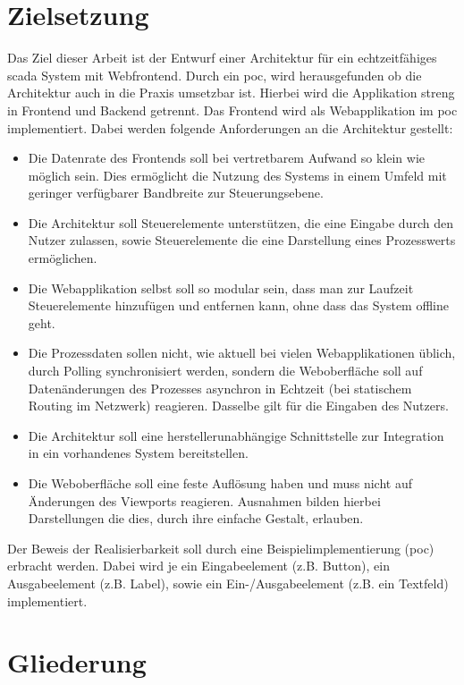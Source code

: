 \section{Zielsetzung}
Das Ziel dieser Arbeit ist der Entwurf einer Architektur für ein
echtzeitfähiges \ac{scada} System mit Webfrontend.
Durch ein \ac{poc}, wird herausgefunden ob die Architektur auch in die Praxis umsetzbar ist.
Hierbei wird die Applikation streng in Frontend und Backend getrennt. Das Frontend wird als Webapplikation im \ac{poc} implementiert.
Dabei werden folgende Anforderungen an die Architektur gestellt:
\begin{itemize}
    \item   Die Datenrate des Frontends soll bei vertretbarem Aufwand so klein wie möglich sein.
            Dies ermöglicht die Nutzung des Systems in einem Umfeld mit geringer verfügbarer Bandbreite zur Steuerungsebene.
    \item   Die Architektur soll Steuerelemente unterstützen, die eine Eingabe durch den Nutzer zulassen, sowie Steuerelemente die eine Darstellung eines Prozesswerts ermöglichen.
    \item   Die Webapplikation selbst soll so modular sein, dass man zur Laufzeit Steuerelemente hinzufügen und entfernen kann, ohne dass das System offline geht.
    \item   Die Prozessdaten sollen nicht, wie aktuell bei vielen Webapplikationen üblich, durch Polling synchronisiert werden, sondern die Weboberfläche soll auf Datenänderungen des Prozesses asynchron in Echtzeit (bei statischem Routing im Netzwerk) reagieren. Dasselbe gilt für die Eingaben des Nutzers.
    \item   Die Architektur soll eine herstellerunabhängige Schnittstelle zur Integration in ein vorhandenes System bereitstellen.
    \item   Die Weboberfläche soll eine feste Auflösung haben und muss nicht auf Änderungen des Viewports reagieren.
            Ausnahmen bilden hierbei Darstellungen die dies, durch ihre einfache Gestalt, erlauben.
\end{itemize}
Der Beweis der Realisierbarkeit soll durch eine Beispielimplementierung (\ac{poc}) erbracht werden.
Dabei wird je ein Eingabeelement (z.B. Button), ein Ausgabeelement (z.B. Label), sowie ein Ein-/Ausgabeelement (z.B. ein Textfeld) implementiert.

\section{Gliederung}
